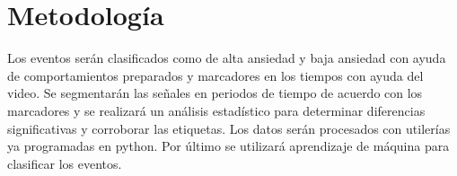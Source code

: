 \section{Metodolog\'ia}
	Los eventos ser\'an clasificados como de alta ansiedad y baja ansiedad con ayuda de comportamientos preparados y marcadores en los tiempos con ayuda del video.
	Se segmentar\'an las se\~nales en periodos de tiempo de acuerdo con los marcadores y se realizar\'a un an\'alisis estad\'istico para determinar diferencias significativas y corroborar las etiquetas. Los datos ser\'an procesados con utiler\'ias ya programadas en python. Por \'ultimo se utilizar\'a aprendizaje de m\'aquina para clasificar los eventos.
\newpage
